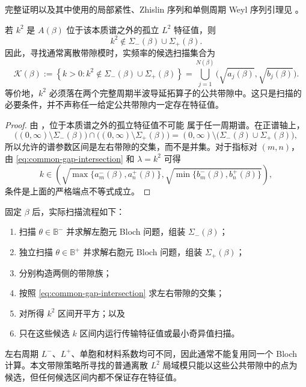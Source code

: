 完整证明以及其中使用的局部紧性、Zhislin 序列和单侧周期 Weyl 序列引理见
。

\begin{corollary}
\label{cor:admissible-scan-intervals}
\label{prop:admissible-scan-intervals}
若 $k^2$ 是 $A(\beta)$ 位于该本质谱之外的孤立 $L^2$ 特征值，则
\[
  k^2\notin\Sigma_-(\beta)\cup\Sigma_+(\beta).
\]
因此，寻找通常离散带隙模时，实频率的候选扫描集合为
\begin{equation}
  \mathcal K(\beta)
  :=\left\{k>0:
  k^2\notin\Sigma_-(\beta)\cup\Sigma_+(\beta)\right\}
  =\bigcup_{j=1}^{N(\beta)}
    \bigl(\sqrt{a_j(\beta)},\sqrt{b_j(\beta)}\bigr).
  \label{eq:admissible-k-scan}
\end{equation}
等价地，$k^2$ 必须落在两个完整周期半波导延拓算子的公共带隙中。这只是扫描的
必要条件，并不声称任一给定公共带隙内一定存在特征值。
\end{corollary}
\begin{proof}
由 ，位于本质谱之外的孤立特征值不可能
属于任一周期谱。在正谱轴上，
\[
  \bigl((0,\infty)\setminus\Sigma_-(\beta)\bigr)
  \cap
  \bigl((0,\infty)\setminus\Sigma_+(\beta)\bigr)
  =(0,\infty)\setminus
  \bigl(\Sigma_-(\beta)\cup\Sigma_+(\beta)\bigr),
\]
所以允许的谱参数区间是左右带隙的交集，而不是并集。对于指标对 $(m,n)$，
由 \eqref{eq:common-gap-intersection} 和 $\lambda=k^2$ 可得
\[
  k\in\left(
  \sqrt{\max\{a_m^-(\beta),a_n^+(\beta)\}},
  \sqrt{\min\{b_m^-(\beta),b_n^+(\beta)\}}
  \right),
\]
条件是上面的严格端点不等式成立。
\end{proof}

\begin{remark}[数值实现结论]
固定 $\beta$ 后，实际扫描流程如下：
\begin{enumerate}[leftmargin=*]
  \item 扫描 $\theta\in\mathbb B^-$ 并求解左胞元 Bloch 问题，组装
  $\Sigma_-(\beta)$；
  \item 独立扫描 $\theta\in\mathbb B^+$ 并求解右胞元 Bloch 问题，组装
  $\Sigma_+(\beta)$；
  \item 分别构造两侧的带隙族；
  \item 按照 \eqref{eq:common-gap-intersection} 求左右带隙的交集；
  \item 对所得 $k^2$ 区间开平方；以及
  \item 只在这些候选 $k$ 区间内运行传输特征值或最小奇异值扫描。
\end{enumerate}
左右周期 $L^-$、$L^+$、单胞和材料系数均可不同，因此通常不能复用同一个 Bloch
计算。本文带隙策略所寻找的普通离散 $L^2$ 局域模只能以这些公共带隙中的点为
候选，但任何候选区间内都不保证存在特征值。
\end{remark}


